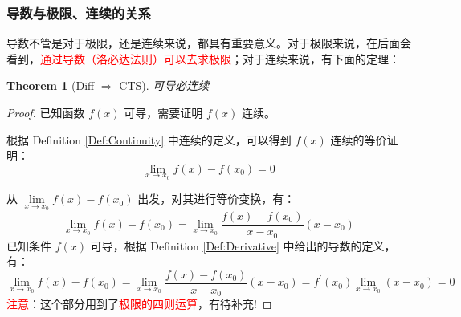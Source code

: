 \documentclass{ctexart}
\numberwithin{equation}{section}
\numberwithin{figure}{section}
\newtheorem{myThm}{Theorem}[section]
\begin{document}
\subsubsection{导数与极限、连续的关系}
导数不管是对于极限，还是连续来说，都具有重要意义。对于极限来说，在后面会看到，\textcolor{red}{通过导数（洛必达法则）可以去求极限}；对于连续来说，有下面的定理：
\begin{myThm}[Diff \(\Rightarrow\) CTS]\label{Thm:DiffCTS}
    可导必连续
\end{myThm}
\begin{proof}
    已知函数 \(f(x)\) 可导，需要证明 \(f(x)\) 连续。

    根据 Definition \ref{Def:Continuity} 中连续的定义，可以得到 \(f(x)\) 连续的等价证明：
    \begin{equation*}
        \lim\limits_{x\to x_0}f(x) - f(x_0) = 0
    \end{equation*}

    从 \(\lim\limits_{x\to x_0}f(x) - f(x_0)\) 出发，对其进行等价变换，有：
    \begin{equation*}
        \lim\limits_{x\to x_0}f(x) - f(x_0) = \lim\limits_{x\to x_0}\frac{f(x) - f(x_0)}{x - x_0}(x - x_0)
    \end{equation*}
    已知条件 \(f(x)\) 可导，根据 Definition \ref{Def:Derivative} 中给出的导数的定义，有：
    \begin{equation*}
        \lim\limits_{x\to x_0}f(x) - f(x_0) = \lim\limits_{x\to x_0}\frac{f(x) - f(x_0)}{x - x_0}(x - x_0) =
        f^{\prime}(x_0)\lim\limits_{x\to x_0}(x - x_0) = 0
    \end{equation*}
    \textcolor{red}{注意}：这个部分用到了\textcolor{red}{极限的四则运算}，有待补充!
\end{proof}
\end{document}
